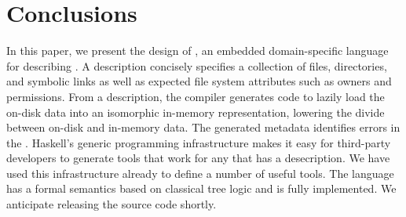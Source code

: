 \section{Conclusions}
\label{sec:conclusion}
In this paper, we present the design of \forest{}, an embedded
domain-specific language for describing \filestores{}.  A \forest{}
description concisely specifies a collection of files, directories,
and symbolic links as well as expected file system attributes such as
owners and permissions.  From a description, the \forest{} compiler
generates code to lazily load the on-disk data into an isomorphic
in-memory representation, lowering the divide between on-disk and
in-memory data.  The generated metadata identifies errors in the
\filestore{}.  Haskell's generic programming infrastructure makes it
easy for third-party developers to generate tools that work for any 
\filestore{} that has a \forest{} desecription. We have used this
infrastructure already to define a number of useful tools. The
language has a formal semantics based on classical tree logic and is
fully implemented.  We anticipate releasing the source code shortly.
